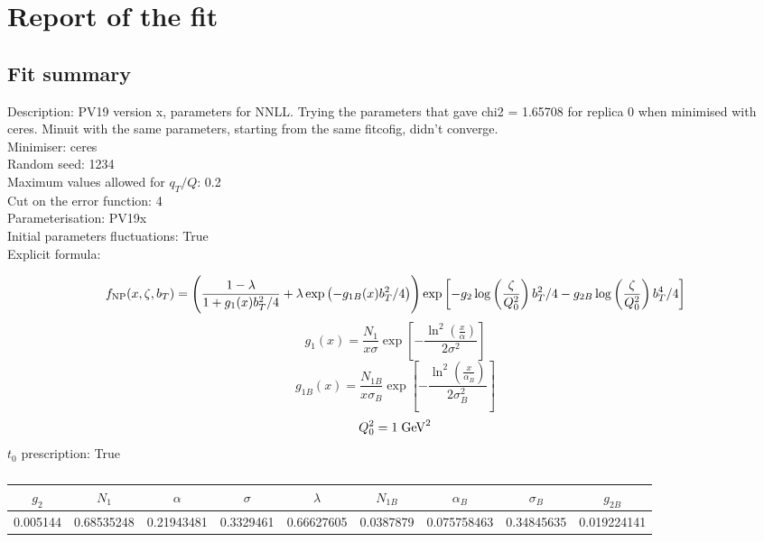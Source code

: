 \documentclass[
]{article}
\date{}
\begin{document}
\hypertarget{report-of-the-fit}{%
\section{Report of the fit}\label{report-of-the-fit}}

\hypertarget{fit-summary}{%
\subsection{Fit summary}\label{fit-summary}}

Description: PV19 version x, parameters for NNLL. Trying the parameters
that gave chi2 = 1.65708 for replica 0 when minimised with ceres. Minuit
with the same parameters, starting from the same fitcofig, didn't
converge.\\
Minimiser: ceres\\
Random seed: 1234\\
Maximum values allowed for \(q_T / Q\): 0.2\\
Cut on the error function: 4\\
Parameterisation: PV19x\\
Initial parameters fluctuations: True\\
Explicit formula:

\[f_{\rm NP}(x,\zeta, b_T)= \Biggl(
\frac{1-\lambda}{1 + g_1(x) b_T^2/4} + \lambda \exp \left(-g_{1B}(x) b_T^2 / 4 \right)\Biggr) \exp\left[- g_2 \log\left(\frac{\zeta}{Q_0^2}\right) b_T^2/4 - g_{2B} \log\left(\frac{\zeta}{Q_0^2}\right) b_T^4/4 \right]\]\[g_1(x) = \frac{N_1}{x\sigma} \exp\left[ - \frac{\ln^2\left(\frac{x}{\alpha}\right)}{2 \sigma^2} \right]\]\[g_{1B}(x) = \frac{N_{1B}}{x\sigma_B} \exp\left[ - \frac{\ln^2\left(\frac{x}{\alpha_B}\right)}{2 \sigma_B^2} \right]\]\[Q_0^2 = 1\;{\rm GeV}^2\]
\(t_0\) prescription: True

\begin{table}[h]

\centering

\begin{tabular}{|c|c|c|c|c|c|c|c|c|} \hline

\textbf{\(g_2\)} & \textbf{\(N_1\)} & \textbf{\(\alpha\)} & \textbf{\(\sigma\)} & \textbf{\(\lambda\)} & \textbf{\(N_{1B}\)} & \textbf{\(\alpha_B\)} & \textbf{\(\sigma_B\)} & \textbf{\(g_{2B}\)} \\ \hline

0.005144 & 0.68535248 & 0.21943481 & 0.3329461 & 0.66627605 & 0.0387879 & 0.075758463 & 0.34845635 & 0.019224141 \\ \hline

\end{tabular}

\caption{}

\end{table}
\end{document}
